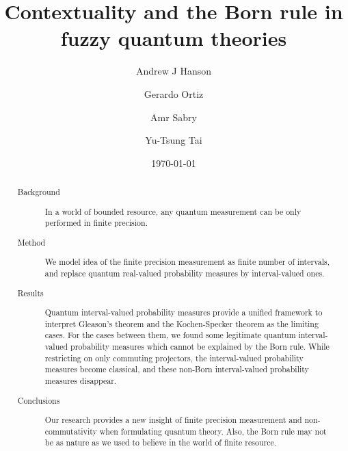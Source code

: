 \documentclass[english,reprint, aps, prl,superscriptaddress, showpacs,
showkeys]{revtex4-1}
\theoremstyle{plain}
\theoremstyle{definition}
\begin{document}
\title{Contextuality and the Born rule in fuzzy quantum theories}

\author{Andrew J Hanson}

\author{Gerardo Ortiz}

\author{Amr Sabry}

\author{Yu-Tsung Tai}

\date{\today}

\begin{abstract}
\begin{description}
\item [{Background}] In a world of bounded resource, any quantum measurement
can be only performed in finite precision. {\small \par}
\item [{Method}] We model idea of the finite precision measurement as finite
number of intervals, and replace quantum real-valued probability measures
by interval-valued ones. {\small \par}
\item [{Results}] Quantum interval-valued probability measures provide
a unified framework to interpret Gleason's theorem and the Kochen-Specker
theorem as the limiting cases. For the cases between them, we found
some legitimate quantum interval-valued probability measures which
cannot be explained by the Born rule. While restricting on only commuting
projectors, the interval-valued probability measures become classical,
and these non-Born interval-valued probability measures disappear. {\small \par}
\item [{Conclusions}] Our research provides a new insight of finite precision
measurement and non-commutativity when formulating quantum theory.
Also, the Born rule may not be as nature as we used to believe in
the world of finite resource.{\small \par}
\end{description}
\end{abstract}

\end{document}
